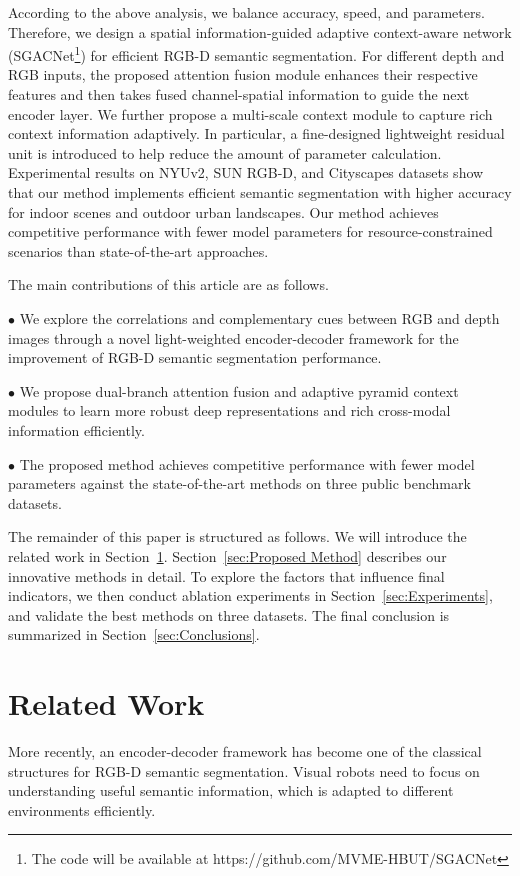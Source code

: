 \documentclass[journal,twoside,web]{ieeecolor}
\begin{document}
According to the above analysis, we balance accuracy, speed, and parameters. Therefore, we design a spatial information-guided adaptive context-aware network (SGACNet\footnote{The code will be available at https://github.com/MVME-HBUT/SGACNet}) for efficient RGB-D semantic segmentation. For different depth and RGB inputs, the proposed attention fusion module enhances their respective features and then takes fused channel-spatial information to guide the next encoder layer. We further propose a multi-scale context module to capture rich context information adaptively. In particular, a fine-designed lightweight residual unit is introduced to help reduce the amount of parameter calculation. Experimental results on NYUv2, SUN RGB-D, and Cityscapes datasets show that our method implements efficient semantic segmentation with higher accuracy for indoor scenes and outdoor urban landscapes. Our method achieves competitive performance with fewer model parameters for resource-constrained scenarios than state-of-the-art approaches.


The main contributions of this article are as follows.

$\bullet $ We explore the correlations and complementary cues between RGB and depth images through a novel light-weighted encoder-decoder framework for the improvement of RGB-D semantic segmentation performance.

$\bullet $ We propose dual-branch attention fusion and adaptive pyramid context modules to learn more robust deep representations and rich cross-modal information efficiently. 

$\bullet $ The proposed method achieves competitive performance with fewer model parameters against the state-of-the-art methods on three public benchmark datasets.

The remainder of this paper is structured as follows. We will introduce the related work in Section~\ref{sec:Related Work}. Section~\ref{sec:Proposed Method} describes our innovative methods in detail. To explore the factors that influence final indicators, we then conduct ablation experiments in Section~\ref{sec:Experiments}, and validate the best methods on three datasets. The final conclusion is summarized in Section~\ref{sec:Conclusions}.


\section{Related Work}\label{sec:Related Work}
More recently, an encoder-decoder framework has become one of the classical structures for RGB-D semantic segmentation. Visual robots need to focus on understanding useful semantic information, which is adapted to different environments efficiently. 
\end{document}

